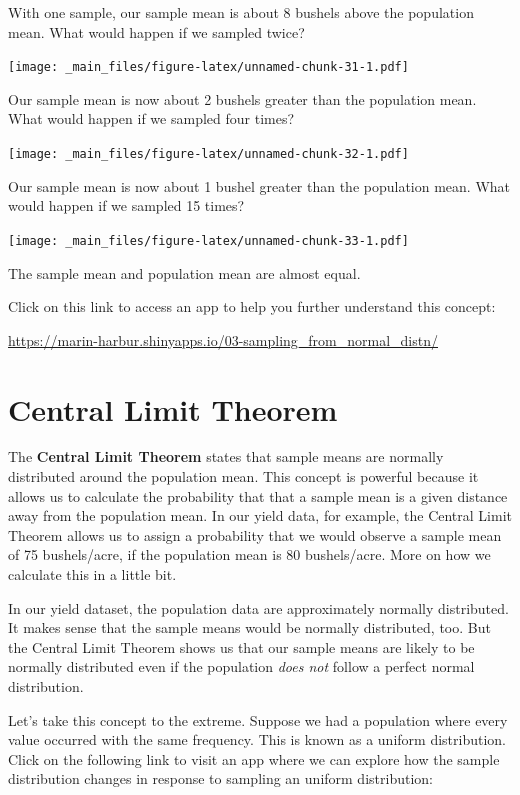 \documentclass[
]{book}
\begin{document}
With one sample, our sample mean is about 8 bushels above the population
mean. What would happen if we sampled twice?

\texttt{[image: \_main\_files/figure-latex/unnamed-chunk-31-1.pdf]}

Our sample mean is now about 2 bushels greater than the population mean.
What would happen if we sampled four times?

\texttt{[image: \_main\_files/figure-latex/unnamed-chunk-32-1.pdf]}

Our sample mean is now about 1 bushel greater than the population mean.
What would happen if we sampled 15 times?

\texttt{[image: \_main\_files/figure-latex/unnamed-chunk-33-1.pdf]}

The sample mean and population mean are almost equal.

Click on this link to access an app to help you further understand this
concept:

\url{https://marin-harbur.shinyapps.io/03-sampling_from_normal_distn/}

\hypertarget{central-limit-theorem}{%
\section{Central Limit Theorem}\label{central-limit-theorem}}

The \textbf{Central Limit Theorem} states that sample means are normally
distributed around the population mean. This concept is powerful because
it allows us to calculate the probability that that a sample mean is a
given distance away from the population mean. In our yield data, for
example, the Central Limit Theorem allows us to assign a probability
that we would observe a sample mean of 75 bushels/acre, if the
population mean is 80 bushels/acre. More on how we calculate this in a
little bit.

In our yield dataset, the population data are approximately normally
distributed. It makes sense that the sample means would be normally
distributed, too. But the Central Limit Theorem shows us that our sample
means are likely to be normally distributed even if the population \emph{does
not} follow a perfect normal distribution.

Let's take this concept to the extreme. Suppose we had a population
where every value occurred with the same frequency. This is known as a
uniform distribution. Click on the following link to visit an app where
we can explore how the sample distribution changes in response to
sampling an uniform distribution:
\end{document}
